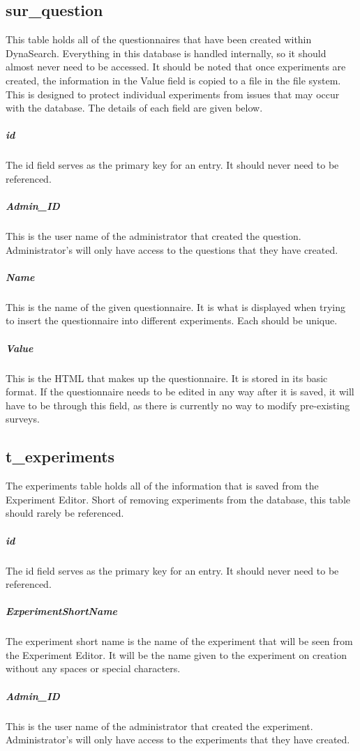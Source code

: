 \documentclass[article]{ij4uq}              %
\begin{document}
\subsection{sur\_question}
This table holds all of the questionnaires that have been created within DynaSearch. Everything in this database is handled internally, so it should almost never need to be accessed. It should be noted that once experiments are created, the information in the Value field is copied to a file in the file system. This is designed to protect individual experiments from issues that may occur with the database. The details of each field are given below.

\subparagraph{id}
The id field serves as the primary key for an entry. It should never need to be referenced.

\subparagraph{Admin\_ID}
This is the user name of the administrator that created the question.  Administrator's will only have access to the questions that they have created.

\subparagraph{Name}
This is the name of the given questionnaire. It is what is displayed when trying to insert the questionnaire into different experiments. Each should be unique.

\subparagraph{Value}
This is the HTML that makes up the questionnaire. It is stored in its basic format. If the questionnaire needs to be edited in any way after it is saved, it will have to be through this field, as there is currently no way to modify pre-existing surveys. 


\subsection{t\_experiments }
The experiments table holds all of the information that is saved from the Experiment Editor. Short of removing experiments from the database, this table should rarely be referenced. 

\subparagraph{id} 
The id field serves as the primary key for an entry. It should never need to be referenced. 

\subparagraph{ExperimentShortName}
The experiment short name is the name of the experiment that will be seen from the Experiment Editor. It will be the name given to the experiment on creation without any spaces or special characters.

\subparagraph{Admin\_ID}
This is the user name of the administrator that created the experiment.  Administrator's will only have access to the experiments that they have created.
\end{document}
